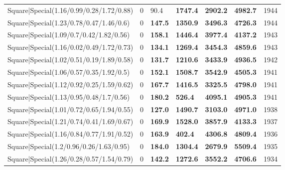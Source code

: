 \begin{tabular}{lrllllr}
 Square|Special(1.16/0.99/0.28/1.72/0.88)                      &             0   & 90.4           & \textbf{1747.4} & \textbf{2902.2} & \textbf{4982.7} &         1944 \\
 Square|Special(1.23/0.78/0.47/1.46/0.6)                       &             0   & \textbf{147.5} & \textbf{1350.9} & \textbf{3496.3} & \textbf{4726.3} &         1944 \\
 Square|Special(1.09/0.7/0.42/1.82/0.56)                       &             0   & \textbf{158.1} & \textbf{1446.4} & \textbf{3977.4} & \textbf{4137.2} &         1943 \\
 Square|Special(1.16/0.02/0.49/1.72/0.73)                      &             0   & \textbf{134.1} & \textbf{1269.4} & \textbf{3454.3} & \textbf{4859.6} &         1943 \\
 Square|Special(1.02/0.51/0.19/1.89/0.58)                      &             0   & \textbf{131.7} & \textbf{1210.6} & \textbf{3433.9} & \textbf{4936.5} &         1942 \\
 Square|Special(1.06/0.57/0.35/1.92/0.5)                       &             0   & \textbf{152.1} & \textbf{1508.7} & \textbf{3542.9} & \textbf{4505.3} &         1941 \\
 Square|Special(1.12/0.92/0.25/1.59/0.62)                      &             0   & \textbf{167.7} & \textbf{1416.5} & \textbf{3325.5} & \textbf{4798.0} &         1941 \\
 Square|Special(1.13/0.95/0.48/1.7/0.56)                       &             0   & \textbf{180.2} & \textbf{526.4}  & \textbf{4095.1} & \textbf{4905.3} &         1941 \\
 Square|Special(1.01/0.72/0.65/1.94/0.55)                      &             0   & \textbf{127.0} & \textbf{1490.7} & \textbf{3103.0} & \textbf{4971.0} &         1938 \\
 Square|Special(1.21/0.74/0.41/1.69/0.67)                      &             0   & \textbf{169.9} & \textbf{1528.0} & \textbf{3857.9} & \textbf{4133.3} &         1937 \\
 Square|Special(1.16/0.84/0.77/1.91/0.52)                      &             0   & \textbf{163.9} & \textbf{402.4}  & \textbf{4306.8} & \textbf{4809.4} &         1936 \\
 Square|Special(1.2/0.96/0.26/1.63/0.95)                       &             0   & \textbf{184.0} & \textbf{1304.4} & \textbf{2679.9} & \textbf{5509.4} &         1935 \\
 Square|Special(1.26/0.28/0.57/1.54/0.79)                      &             0   & \textbf{142.2} & \textbf{1272.6} & \textbf{3552.2} & \textbf{4706.6} &         1934 \\

\end{tabular}
